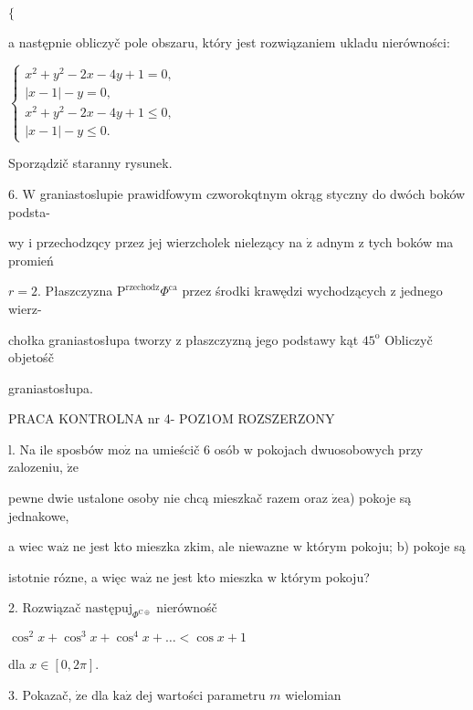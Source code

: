 \documentclass[a4paper,12pt]{article}
\begin{document}
$\{$

a następnie obliczyč pole obszaru, który jest rozwiązaniem ukladu nierówności:

$\left\{\begin{array}{l}
x^{2}+y^{2}-2x-4y+1=0,\\
|x-1|-y=0,\\
x^{2}+y^{2}-2x-4y+1\leq 0,\\
|x-1|-y\leq 0.
\end{array}\right.$

Sporządzič staranny rysunek.

6. $\mathrm{W}$ graniastoslupie prawidfowym czworokqtnym okrąg styczny do dwóch boków podsta-

wy $\mathrm{i}$ przechodzqcy przez jej wierzcholek nielezący na $\dot{\mathrm{z}}$ adnym $\mathrm{z}$ tych boków ma promień

$r=2$. Płaszczyzna $\mathrm{P}^{\mathrm{r}\mathrm{z}\mathrm{e}\mathrm{c}\mathrm{h}\mathrm{o}\mathrm{d}\mathrm{z}}\Phi^{\mathrm{c}\mathrm{a}}$ przez środki krawędzi wychodzących $\mathrm{z}$ jednego wierz-

chołka graniastosłupa tworzy $\mathrm{z}$ płaszczyzną jego podstawy kąt $45^{\mathrm{o}}$ Obliczyč objetośč

graniastosłupa.




PRACA KONTROLNA nr 4- POZ1OM ROZSZERZONY

l. Na ile sposbów $\mathrm{m}\mathrm{o}\dot{\mathrm{z}}$ na umieścič 6 osób $\mathrm{w}$ pokojach dwuosobowych przy zalozeniu, $\dot{\mathrm{z}}\mathrm{e}$

pewne dwie ustalone osoby nie chcą mieszkač razem oraz $\dot{\mathrm{z}}\mathrm{e} \mathrm{a}$) pokoje są jednakowe,

a wiec $\mathrm{w}\mathrm{a}\dot{\mathrm{z}}$ ne jest kto mieszka $\mathrm{z} \mathrm{k}\mathrm{i}\mathrm{m}$, ale niewazne $\mathrm{w}$ którym pokoju; b) pokoje są

istotnie rózne, a więc $\mathrm{w}\mathrm{a}\dot{\mathrm{z}}$ ne jest kto mieszka $\mathrm{w}$ którym pokoju?

2. Rozwiązač $\mathrm{n}\mathrm{a}\mathrm{s}\mathrm{t}\text{ę} \mathrm{p}\mathrm{u}\mathrm{j}_{\Phi^{\mathrm{C}\oplus}}$ nierównośč

$\cos^{2}x+\cos^{3}x+\cos^{4}x+\ldots<\cos x+1$

dla $x\in[0,2\pi].$

3. Pokazač, $\dot{\mathrm{z}}\mathrm{e}$ dla $\mathrm{k}\mathrm{a}\dot{\mathrm{z}}$ dej wartości parametru $m$ wielomian
\end{document}

